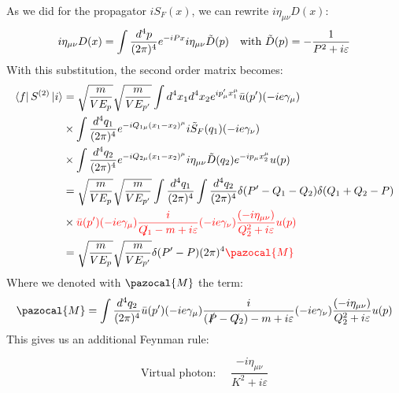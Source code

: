 \documentclass[../main.tex]{subfiles}
\begin{document}
As we did for the propagator $iS_F(x)$, we can rewrite $i\eta_{\mu\nu}D(x)$:
\[
i\eta_{\mu\nu}D(x)=\int\frac{d^4p}{(2\pi)^4}e^{-iPx}i\eta_{\mu\nu}\Tilde{D}(p) \quad \text{with } \Tilde{D}(p)=-\frac{1}{P^2+i\varepsilon}
\]
With this substitution, the second order matrix becomes:
\begin{align*}
\bra{f}S^{(2)}\ket{i}&=\sqrt{\frac{m}{VE_p}}\sqrt{\frac{m}{VE_{p'}}}\int d^4x_1d^4x_2e^{ip'_\mu x_1^\mu}\bar{u}(p')(-ie\gamma_\mu)\\
&\times\int\frac{d^4q_1}{(2\pi)^4}e^{-iQ_{1\mu}(x_1-x_2)^\mu}i\Tilde{S}_F(q_1)(-ie\gamma_\nu)\\
&\times\int\frac{d^4q_2}{(2\pi)^4}e^{-iQ_{2\mu}(x_1-x_2)^\mu}i\eta_{\mu\nu}\Tilde{D}(q_2)e^{-ip_\mu x_2^\mu}u(p)\\
&=\sqrt{\frac{m}{VE_p}}\sqrt{\frac{m}{VE_{p'}}}\int\frac{d^4q_1}{(2\pi)^4}\int\frac{d^4q_2}{(2\pi)^4}\delta(P'-Q_1-Q_2)\delta(Q_1+Q_2-P)\\
&\times{\color{red}\bar{u}(p')(-ie\gamma_\mu)\frac{i}{\slashed{Q_1}-m+i\varepsilon}(-ie\gamma_\nu)\frac{(-i\eta_{\mu\nu})}{Q_2^2+i\varepsilon}u(p)}\\
&=\sqrt{\frac{m}{VE_p}}\sqrt{\frac{m}{VE_{p'}}}\delta(P'-P)(2\pi)^4{\color{red}\pazocal{M}} 
\end{align*}
Where we denoted with $\pazocal{M}$ the term:
\[
\pazocal{M}=\int\frac{d^4q_2}{(2\pi)^4}\bar{u}(p')(-ie\gamma_\mu)\frac{i}{(\slashed{P}-\slashed{Q_2})-m+i\varepsilon}(-ie\gamma_\nu)\frac{(-i\eta_{\mu\nu})}{Q_2^2+i\varepsilon}u(p)
\]
This gives us an additional Feynman rule:
\begin{kaobox}[frametitle=Feynman rules]
\[
\text{Virtual photon: }\quad \frac{-i\eta_{\mu\nu}}{K^2+i\varepsilon}
\]
\end{kaobox}
\end{document}
